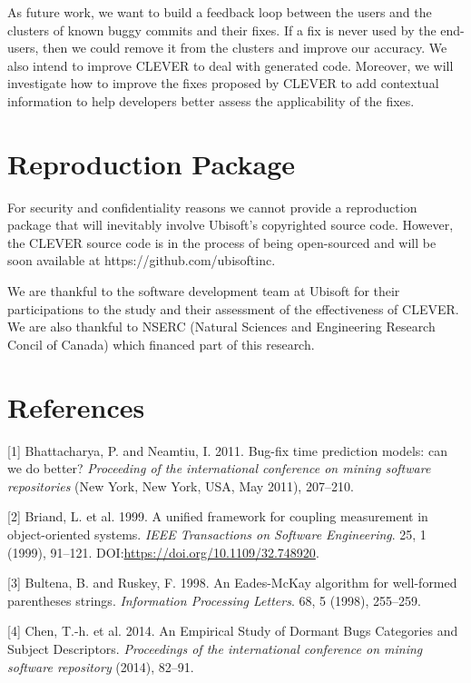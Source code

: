 \documentclass[sigconf]{acmart}
\begin{document}
As future work, we want to build a feedback loop between the users and
the clusters of known buggy commits and their fixes. If a fix is never
used by the end-users, then we could remove it from the clusters and
improve our accuracy. We also intend to improve CLEVER to deal with
generated code. Moreover, we will investigate how to improve the fixes
proposed by CLEVER to add contextual information to help developers
better assess the applicability of the fixes.

\section{Reproduction Package}\label{reproduction-package}

For security and confidentiality reasons we cannot provide a
reproduction package that will inevitably involve Ubisoft's copyrighted
source code. However, the CLEVER source code is in the process of being
open-sourced and will be soon available at
https://github.com/ubisoftinc.

\begin{acks}
We are thankful to the software development team at  Ubisoft for their participations to the study and their assessment of the effectiveness of CLEVER.
We are also thankful to NSERC (Natural Sciences and Engineering Research Concil of Canada) which financed part of this research.
\end{acks}

\section*{References}

\setlength{\parindent}{0pt} \setlength{\parskip}{0.5em}


[1] Bhattacharya, P. and Neamtiu, I. 2011. Bug-fix time prediction
models: can we do better? \emph{Proceeding of the international
conference on mining software repositories} (New York, New York, USA,
May 2011), 207--210.


[2] Briand, L. et al. 1999. A unified framework for coupling
measurement in object-oriented systems. \emph{IEEE Transactions on
Software Engineering}. 25, 1 (1999), 91--121.
DOI:\url{https://doi.org/10.1109/32.748920}.


[3] Bultena, B. and Ruskey, F. 1998. An Eades-McKay algorithm for
well-formed parentheses strings. \emph{Information Processing Letters}.
68, 5 (1998), 255--259.


[4] Chen, T.-h. et al. 2014. An Empirical Study of Dormant Bugs
Categories and Subject Descriptors. \emph{Proceedings of the
international conference on mining software repository} (2014), 82--91.
\end{document}
